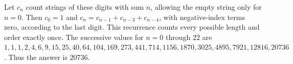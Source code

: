 Let $c_n$ count strings of these digits with sum $n$, allowing the empty string only for $n=0$. Then $c_0=1$ and $c_n=c_{n-1}+c_{n-3}+c_{n-4}$, with negative-index terms zero, according to the last digit. This recurrence counts every possible length and order exactly once. The successive values for $n=0$ through $22$ are $1,1,1,2,4,6,9,15,25,40,64,104,169,273,441,714,1156,1870,3025,4895,7921,12816,20736$. Thus the answer is $\boxed{20736}$.
